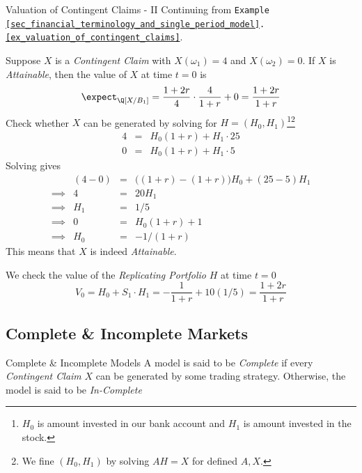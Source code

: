 \documentclass[11pt,a4paper]{article}
\begin{document}
  \begin{example}{Valuation of Contingent Claims - II}
    Continuing from \texttt{Example \ref{sec_financial_terminology_and_single_period_model}.\ref{ex_valuation_of_contingent_claims}}.
    \par Suppose $X$ is a \textit{Contingent Claim} with $X(\omega_1)=4$ and $X(\omega_2)=0$. If $X$ is \textit{Attainable}, then the value of $X$ at time $t=0$ is
    \[ \expect_\Q[X/B_1]=\frac{1+2r}4\cdot\frac4{1+r}+0=\frac{1+2r}{1+r} \]
    Check whether $X$ can be generated by solving for $H=(H_0,H_1)$\footnote{$H_0$ is amount invested in our bank account and $H_1$ is amount invested in the stock.}\footnote{We fine $(H_0,H_1)$ by solving $AH=X$ for defined $A,X$.}
    \[\begin{array}{rcl}
      4&=&H_0(1+r)+H_1\cdot 25\\
      0&=&H_0(1+r)+H_1\cdot5
    \end{array}\]
    Solving gives
    \[\begin{array}{rrcl}
      &(4-0)&=&\big((1+r)-(1+r)\big)H_0+(25-5)H_1\\
      \implies&4&=&20H_1\\
      \implies&H_1&=&1/5\\
      \implies&0&=&H_0(1+r)+1\\
      \implies&H_0&=&-1/(1+r)
    \end{array}\]
    This means that $X$ is indeed \textit{Attainable}.
    \par We check the value of the \textit{Replicating Portfolio} $H$ at time $t=0$
    \[ V_0=H_0+S_1\cdot H_1=-\frac{1}{1+r}+10(1/5)=\frac{1+2r}{1+r} \]
  \end{example}

\subsection{Complete \& Incomplete Markets}

  \begin{definition}{Complete \& Incomplete Models}
    A model is said to be \textit{Complete} if every \textit{Contingent Claim} $X$ can be generated by some trading strategy. Otherwise, the model is said to be \textit{In-Complete}
  \end{definition}
\end{document}

